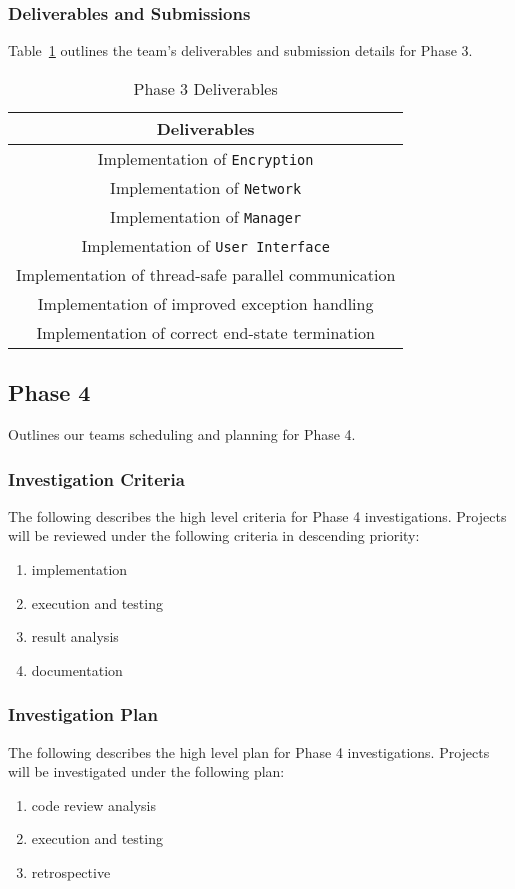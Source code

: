 \documentclass[sigconf]{acmart}
\begin{document}
\subsubsection{Deliverables and Submissions}
Table~\ref{Phase 3 Deliverables} outlines the team's deliverables and submission details for Phase
3.
\begin{table}[htb]
 \centering
 \caption{Phase 3 Deliverables}
 \label{Phase 3 Deliverables}

 \begin{tabular}{|c|} \hline
  \textbf{Deliverables}                                \\ \hline
  Implementation of \texttt{Encryption}                \\ \hline
  Implementation of \texttt{Network}                   \\ \hline
  Implementation of \texttt{Manager}                   \\ \hline
  Implementation of \texttt{User Interface}            \\ \hline
  Implementation of thread-safe parallel communication \\ \hline
  Implementation of improved exception handling        \\ \hline
  Implementation of correct end-state termination      \\ \hline
 \end{tabular}
\end{table}


\subsection{Phase 4}
Outlines our teams scheduling and planning for Phase 4.

\subsubsection{Investigation Criteria}
The following describes the high level criteria for Phase 4 investigations.
Projects will be reviewed under the following criteria in descending priority:
\begin{enumerate}
 \item implementation
 \item execution and testing
 \item result analysis
 \item documentation
\end{enumerate}

\subsubsection{Investigation Plan}
The following describes the high level plan for Phase 4 investigations. Projects
will be investigated under the following plan:
\begin{enumerate}
 \item code review analysis
 \item execution and testing
 \item retrospective
\end{enumerate}
\end{document}
